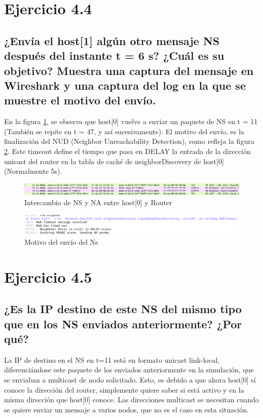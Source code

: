 \section{Ejercicio 4.4}
\subsection{¿Envía el host[1] algún otro mensaje NS después del instante t = 6 s? ¿Cuál es su objetivo? Muestra una captura del mensaje en Wireshark y una captura del log en la que se muestre el motivo del envío.}

En la figura \ref{fig:postNShost0}, se observa que host[0] vuelve a enviar un paquete de NS en t = 11 (También se repite en t = 47, y así sucesivamente). El motivo del envío, es la finalización del NUD (Neighbor Unreachability Detection), como refleja la figura \ref{fig:NS_purpose}. Este timeout define el tiempo que pasa en DELAY la entrada de la dirección unicast del router en la tabla de caché de neighborDiscovery de host[0] (Normalmente 5s).

\begin{figure}[H]
    \centering
    \includegraphics[width=135mm, scale=0.75]{imaxes/ejercicio4_4_1.png}
    \caption{Intercambio de NS y NA entre host[0] y Router}
    \label{fig:postNShost0}
\end{figure}

\begin{figure}[H]
    \centering
    \includegraphics[width=135mm, scale=0.75]{imaxes/ejercicio4_4_2.png}
    \caption{Motivo del envío del Ns}
    \label{fig:NS_purpose}
\end{figure}

\section{Ejercicio 4.5}
\subsection{¿Es la IP destino de este NS del mismo tipo que en los NS enviados anteriormente? ¿Por qué?}

La IP de destino en el NS en t=11 está en formato unicast link-local, diferenciándose este paquete de los enviados anteriormente en la simulación, que se enviaban a multicast de nodo solicitado. Esto, es debido a que ahora host[0] sí conoce la dirección del router, simplemente quiere saber si está activo y en la misma dirección que host[0] conoce. Las direcciones multicast se necesitan cuando se quiere enviar un mensaje a varios nodos, que no es el caso en esta situación.


